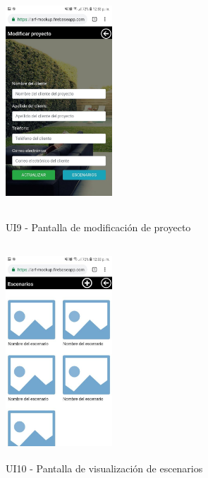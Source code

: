 \begin{figure}[h!]
	\begin{minipage}{0.48\textwidth}
		\centering
		\includegraphics[width=4cm,height=8cm]{imagenes/Anexos/Mockup/modificar_proyecto.jpg}
		\caption{UI9 - Pantalla de modificación de proyecto}
		\label{fig:updateproy}
	\end{minipage}\hfill
	\begin{minipage}{0.48\textwidth}
		\centering
		\includegraphics[width=4cm,height=8cm]{imagenes/Anexos/Mockup/escenarios.jpg}
		\caption{UI10 - Pantalla de visualización de escenarios}
		\label{fig:escenarios}
	\end{minipage}\hfill
\end{figure}


